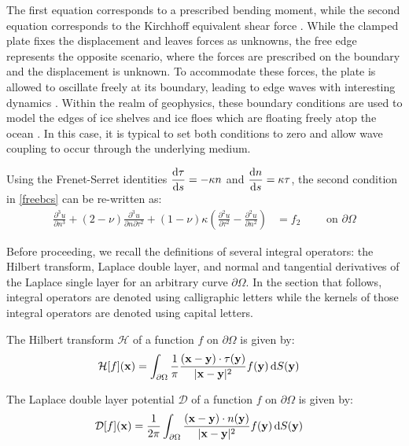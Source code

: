 \documentclass[preprint,12pt,3p]{elsarticle}
\newcommand{\dd}{ {\rm d} }
\begin{document}
The first equation corresponds to a prescribed bending moment, while the second equation corresponds to the Kirchhoff equivalent shear force \cite{Kirchhoff1850}. While the clamped plate fixes the displacement and leaves forces as unknowns, the free edge represents the opposite scenario, where the forces are prescribed on the boundary and the displacement is unknown. To accommodate these forces, the plate is allowed to oscillate freely at its boundary, leading to edge waves with interesting dynamics \cite{Ukrainskii2018}. Within the realm of geophysics, these boundary conditions are used to model the edges of ice shelves and ice floes which are floating freely atop the ocean  \cite{sergienko13, meylan96, meylan2002}. In this case, it is typical to set both conditions to zero and allow wave coupling to occur through the underlying medium. 

Using the Frenet-Serret identities $\displaystyle\frac{{\rm d} \tau}{{\rm d}s} = - \kappa n$ and $\displaystyle \frac{{\rm d} n}{{\rm d} s } =  \kappa \tau $, the second condition in \eqref{freebcs} can be re-written as:
\begin{align}
     \frac{\partial^3 u}{\partial n^3}  + (2 -\nu) \frac{\partial^3 u }{\partial n \partial \tau^2} + (1-\nu) \kappa \left( \frac{\partial^2 u}{\partial \tau^2} - \frac{\partial^2 u}{\partial n^2} \right)  &= f_2 \qquad \text{ on } \partial \Omega 
\end{align}



Before proceeding, we recall the definitions of several integral operators: the Hilbert transform, Laplace double layer, and normal and tangential derivatives of the Laplace single layer for an arbitrary curve $\partial \Omega$. In the section that follows, integral operators are denoted using calligraphic letters while the kernels of those integral operators are denoted using capital letters. 

\begin{definition}
The Hilbert transform $\mathcal{H}$ of a function $f$ on $\partial \Omega$ is given by:
\begin{align}
    \mathcal{H}[f](\mathbf{x}) &=  \int_{\partial \Omega} \frac{1}{\pi} \frac{(\mathbf{x}-\mathbf{y}) \cdot  \tau(\mathbf{y}) }{|\mathbf{x}-\mathbf{y}|^2} f(\mathbf{y}) \, \dd S(\mathbf{y}) \label{hilbertdef}
\end{align}
\end{definition}

\begin{definition}
The Laplace double layer potential $\mathcal{D}$ of a function $f$ on $\partial \Omega$  is given by:
\begin{align}
    \mathcal{D}[f](\mathbf{x}) &= \frac{1}{2 \pi} \int_{\partial \Omega}  \frac{(\mathbf{x}-\mathbf{y}) \cdot  n(\mathbf{y}) }{|\mathbf{x}-\mathbf{y}|^2} f(\mathbf{y}) \, \dd S(\mathbf{y}) \label{doublelayer}
\end{align}
\end{definition}
\end{document}
